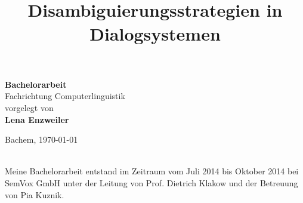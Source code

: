 \documentclass[12pt,a4paper]{scrartcl}
\title{$\,$\\  Disambiguierungsstrategien in Dialogsystemen}
\date{}
\author{}
\begin{document}

\maketitle
\sffamily
\begin{center}
\huge
\textbf{Bachelorarbeit}\\
\vfill
\LARGE
Fachrichtung Computerlinguistik\\
\vfill
\normalsize
vorgelegt von\\
\Large
\textbf{Lena Enzweiler}\\
\vfill


\normalsize
Bachem,
\today

\end{center}

\thispagestyle{empty}
\rmfamily
\cleardoublepage
$\,$\\
\vfill
Meine Bachelorarbeit entstand im Zeitraum vom Juli 2014 bis Oktober 2014 bei SemVox GmbH unter der Leitung von Prof. Dietrich Klakow und der Betreuung von Pia Kuznik.


\cleardoublepage

\tableofcontents
\cleardoublepage

\listoffigures
\cleardoublepage

\listoftables
\cleardoublepage

\cleardoublepage


\renewcommand{\abstractname}{Abstract}
\end{document}
